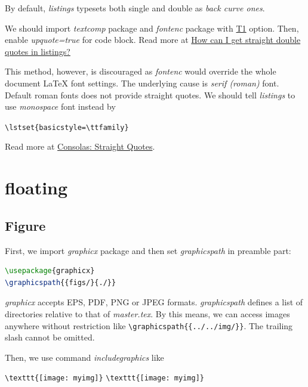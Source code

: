 By default, \textit{listings} typesets both single and double as
\textit{back curve ones}.

We should import \textit{textcomp} package and \textit{fontenc}
package with \href{https://tex.stackexchange.com/a/677}{T1}
option. Then, enable \textit{upquote=true} for code block. Read
more at \href{https://tex.stackexchange.com/q/166790}{How can I
  get straight double quotes in listings?}

This method, however, is discouraged as \textit{fontenc} would
override the whole document \LaTeX{} font settings. The underlying
cause is \textit{serif (roman)} font. Default roman fonts does not
provide straight quotes. We should tell \textit{listings} to use
\textit{monospace} font instead by

\begin{center}
  \verb|\lstset{basicstyle=\ttfamily}|
\end{center}

Read more at
\href{https://tex.stackexchange.com/q/144396}{Consolas: Straight
  Quotes}.

\section{floating}
\label{sec:floating}

\subsection{Figure}
\label{sec:figure}

First, we import \textit{graphicx} package and then set
\textit{graphicspath} in preamble part:
\begin{lstlisting}[language=TeX,caption={graphicx}]
\usepackage{graphicx}
\graphicspath{{figs/}{./}}
\end{lstlisting}

\textit{graphicx} accepts EPS, PDF, PNG or JPEG
formats. \textit{graphicspath} defines a list of directories
relative to that of \textit{master.tex}. By this means, we can
access images anywhere without restriction like
\verb|\graphicspath{{../../img/}}|. The trailing slash cannot be
omitted.

Then, we use command \textit{includegraphics} like

\begin{center}
  \verb|\texttt{[image: myimg]}|
  \verb|\texttt{[image: myimg]}|
\end{center}

